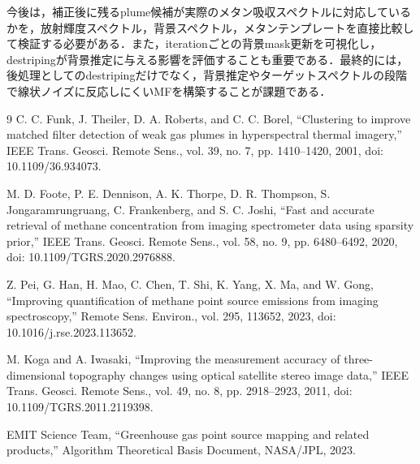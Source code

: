 \documentclass[a4paper,10pt]{ltjsarticle}
\begin{document}
今後は，補正後に残るplume候補が実際のメタン吸収スペクトルに対応しているかを，放射輝度スペクトル，背景スペクトル，メタンテンプレートを直接比較して検証する必要がある．また，iterationごとの背景mask更新を可視化し，destripingが背景推定に与える影響を評価することも重要である．最終的には，後処理としてのdestripingだけでなく，背景推定やターゲットスペクトルの段階で線状ノイズに反応しにくいMFを構築することが課題である．

\begin{thebibliography}{9}
\small
{}
C. C. Funk, J. Theiler, D. A. Roberts, and C. C. Borel, ``Clustering to improve matched filter detection of weak gas plumes in hyperspectral thermal imagery,'' IEEE Trans. Geosci. Remote Sens., vol. 39, no. 7, pp. 1410--1420, 2001, doi: 10.1109/36.934073.

M. D. Foote, P. E. Dennison, A. K. Thorpe, D. R. Thompson, S. Jongaramrungruang, C. Frankenberg, and S. C. Joshi, ``Fast and accurate retrieval of methane concentration from imaging spectrometer data using sparsity prior,'' IEEE Trans. Geosci. Remote Sens., vol. 58, no. 9, pp. 6480--6492, 2020, doi: 10.1109/TGRS.2020.2976888.

Z. Pei, G. Han, H. Mao, C. Chen, T. Shi, K. Yang, X. Ma, and W. Gong, ``Improving quantification of methane point source emissions from imaging spectroscopy,'' Remote Sens. Environ., vol. 295, 113652, 2023, doi: 10.1016/j.rse.2023.113652.

M. Koga and A. Iwasaki, ``Improving the measurement accuracy of three-dimensional topography changes using optical satellite stereo image data,'' IEEE Trans. Geosci. Remote Sens., vol. 49, no. 8, pp. 2918--2923, 2011, doi: 10.1109/TGRS.2011.2119398.

EMIT Science Team, ``Greenhouse gas point source mapping and related products,'' Algorithm Theoretical Basis Document, NASA/JPL, 2023.
\end{thebibliography}
\end{document}

